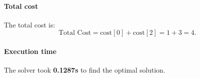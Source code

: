 \documentclass[12pt]{article}
\begin{document}
\paragraph*{Total cost}  
The total cost is:
\[
\text{Total Cost} = \text{cost}[0] + \text{cost}[2] = 1 + 3 = 4.
\]

\paragraph*{Execution time}  
The solver took \textbf{0.1287s} to find the optimal solution.
\end{document}

